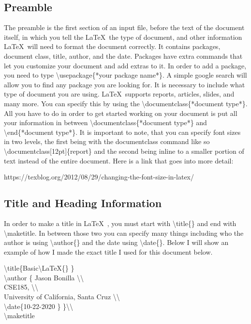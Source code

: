 \documentclass[12pt,journal,compsoc]{IEEEtran}
\begin{document}
\subsection{Preamble}
The preamble is the first section of an input file, before the text of the document itself, in which you tell the \LaTeX\ the type of document, and other information \LaTeX\ will need to format the document correctly. It contains packages, document class, title, author, and the date. Packages have extra commands that let you customize your document and add extras to it. In order to add a package, you need to type \textbackslash{usepackage\{*your package name*\}}. A simple google search will allow you to find any package you are looking for. It is necessary to include what type of document you are using. \LaTeX\ supports reports, articles, slides, and many more. You can specify this by  using the \textbackslash{documentclass\{*document type*\}}. All you have to do in order to get started working on your document is put all your information in between \textbackslash{documentclass\{*document type*\}} and \textbackslash{end\{*document type*\}}. It is important to note, that you can specify font sizes in two levels, the first being with the documentclass command like so \textbackslash{documentclass[12pt]\{report\} } and the second being inline to a smaller portion of text instead of the entire document. Here is a link that goes into more detail:
\begin{center}
    https://texblog.org/2012/08/29/changing-the-font-size-in-latex/
\end{center}

\subsection{Title and Heading Information}
In order to make a title in \LaTeX\ , you must start with \textbackslash{title\{\}} and end with \textbackslash{maketitle}. In between those two you can specify many things including who the author is using \textbackslash{author\{\}} and the date using \textbackslash{date\{\}}. Below I will show an example of how I made the exact title I used for this document below.

\begin{center}
\textbackslash{title}\{Basic\textbackslash{LaTeX\{\}} \} \\
 \textbackslash{author} \{ Jason Bonilla \textbackslash \textbackslash \\
          CSE185, \textbackslash \textbackslash \\
          University of California, Santa Cruz \textbackslash \textbackslash \\
           \textbackslash{date\{{10-22-2020}}
       \} \}\textbackslash \textbackslash  \\
 \textbackslash{maketitle}\\
 \end{center}
\end{document}
